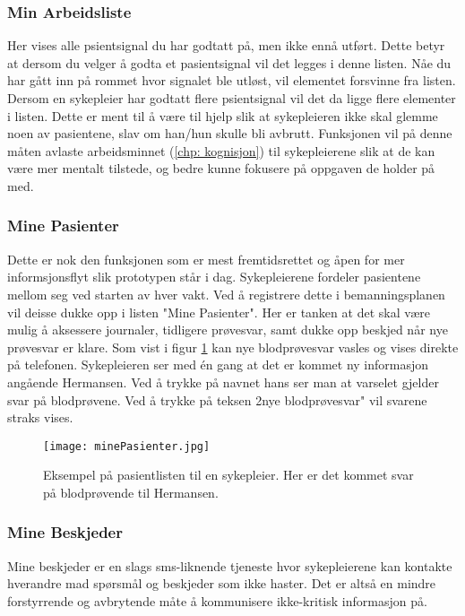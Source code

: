 \subsubsection{Min Arbeidsliste}
Her vises alle psientsignal du har godtatt på, men ikke ennå utført. Dette betyr at dersom du velger å godta et pasientsignal vil det legges i denne listen. Nåe du har gått inn på rommet hvor signalet ble utløst, vil elementet forsvinne fra listen. Dersom en sykepleier har godtatt flere psientsignal vil det da ligge flere elementer i listen. Dette er ment til å være til hjelp slik at sykepleieren ikke skal glemme noen av pasientene, slav om han/hun skulle bli avbrutt. Funksjonen vil på denne måten avlaste arbeidsminnet (\ref{chp: kognisjon}) til sykepleierene slik at de kan være mer mentalt tilstede, og bedre kunne fokusere på oppgaven de holder på med.

\subsubsection{Mine Pasienter}
Dette er nok den funksjonen som er mest fremtidsrettet og åpen for mer informsjonsflyt slik prototypen står i dag. Sykepleierene fordeler pasientene mellom seg ved starten av hver vakt. Ved å registrere dette i bemanningsplanen vil deisse dukke opp i listen "Mine Pasienter". Her er tanken at det skal være mulig å aksessere journaler, tidligere prøvesvar, samt dukke opp beskjed når nye prøvesvar er klare. Som vist i figur \ref{minePasienter} kan nye blodprøvesvar vasles og vises direkte på telefonen. Sykepleieren ser med én gang at det er kommet ny informasjon angående Hermansen. Ved å trykke på navnet hans ser man at varselet gjelder svar på blodprøvene. Ved å trykke på teksen 2nye blodprøvesvar" vil svarene straks vises.

\begin{figure}[H]
\texttt{[image: minePasienter.jpg]}
\caption{Eksempel på pasientlisten til en sykepleier. Her er det kommet svar på blodprøvende til Hermansen.}
\label{minePasienter}
\end{figure}

\subsubsection{Mine Beskjeder}
Mine beskjeder er en slags sms-liknende tjeneste hvor sykepleierene kan kontakte hverandre mad spørsmål og beskjeder som ikke haster. Det er altså en mindre forstyrrende og avbrytende måte å kommunisere ikke-kritisk informasjon på.


